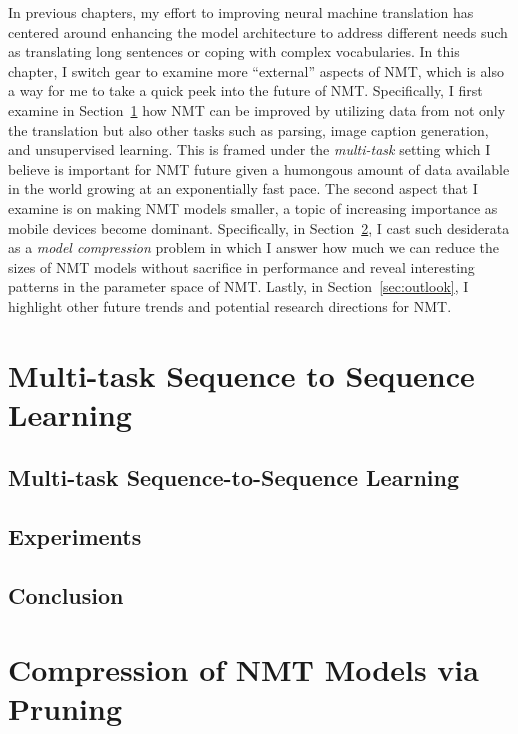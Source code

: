 In previous chapters, my effort to improving neural machine
translation has centered around enhancing the model architecture to address
different needs such as translating long sentences or coping with
complex vocabularies. In this chapter, I switch gear to examine more ``external''
aspects of NMT, which is also a way for me to take a quick peek into the future of NMT.
Specifically, I first examine in Section~\ref{sec:multi-task} how NMT can be improved by utilizing data from
not only the translation but also other tasks such as parsing, image caption
generation, and unsupervised learning. This is framed under the {\it multi-task}
setting which I believe is important for NMT future given a humongous amount of
data available in the world growing at an exponentially fast pace. The second
aspect that I examine is on making NMT models smaller, a topic of 
increasing importance as mobile devices become dominant. Specifically, in
Section~\ref{sec:nmt-compression}, I cast such
desiderata as a {\it model compression} problem in which I answer how much we can
reduce the sizes of NMT models without sacrifice in performance and reveal
interesting patterns in the parameter space of NMT. Lastly, in
Section~\ref{sec:outlook}, I highlight other future trends and potential
research directions for NMT.


\section{Multi-task Sequence to Sequence Learning}
\label{sec:multi-task}


\subsection{Multi-task Sequence-to-Sequence Learning}
\label{subsec:multi}


\subsection{Experiments}
\label{sec:6_1_exp}


\subsection{Conclusion}
\label{sec:conclude}


\section{Compression of NMT Models via Pruning}
\label{sec:nmt-compression}


